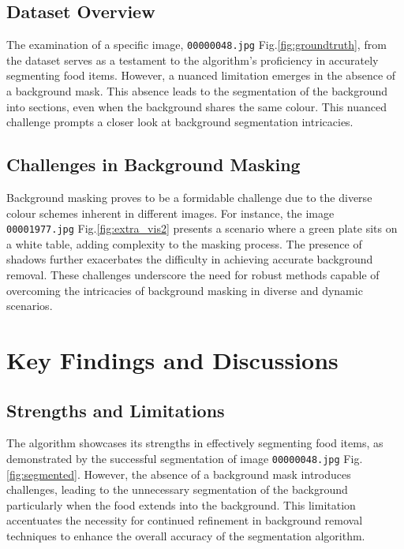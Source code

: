 \documentclass[conference]{IEEEtran}
\begin{document}
 	\subsection{Dataset Overview}
 	
 	The examination of a specific image, \texttt{00000048.jpg} Fig.\ref{fig:groundtruth}, from the dataset serves as a testament to the algorithm's proficiency in accurately segmenting food items. However, a nuanced limitation emerges in the absence of a background mask. This absence leads to the segmentation of the background into sections, even when the background shares the same colour. This nuanced challenge prompts a closer look at background segmentation intricacies.
 	
 	\subsection{Challenges in Background Masking}
 	
 	Background masking proves to be a formidable challenge due to the diverse colour schemes inherent in different images. For instance, the image \texttt{00001977.jpg} Fig.\ref{fig:extra_vis2} presents a scenario where a green plate sits on a white table, adding complexity to the masking process. The presence of shadows further exacerbates the difficulty in achieving accurate background removal. These challenges underscore the need for robust methods capable of overcoming the intricacies of background masking in diverse and dynamic scenarios.
 	
 	\section{Key Findings and Discussions}
 	
 	\subsection{Strengths and Limitations}
 	
 	The algorithm showcases its strengths in effectively segmenting food items, as demonstrated by the successful segmentation of image \texttt{00000048.jpg} Fig.\ref{fig:segmented}. However, the absence of a background mask introduces challenges, leading to the unnecessary segmentation of the background particularly when the food extends into the background. This limitation accentuates the necessity for continued refinement in background removal techniques to enhance the overall accuracy of the segmentation algorithm.
 	
\end{document}
